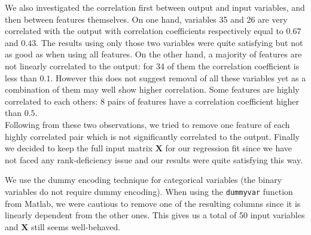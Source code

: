 \documentclass{article} %
\begin{document}
  We also investigated the correlation first between output and input variables, and then between features themselves. On one hand, variables 35 and 26 are very correlated with the output with correlation coefficients respectively equal to $0.67$ and $0.43$. The results using only those two variables were quite satisfying but not as good as when using all features. On the other hand, a majority of features are not linearly correlated to the output: for 34 of them the correlation coefficient is less than $0.1$. However this does not suggest removal of all these variables yet as a combination of them may well show higher correlation. Some features are highly correlated to each others: 8 pairs of features have a correlation coefficient higher than $0.5$.\\
  Following from these two observations, we tried to remove one feature of each highly correlated pair which is not significantly correlated to the output. Finally we decided to keep the full input matrix $\mathbf{X}$ for our regression fit since we have not faced any rank-deficiency issue and our results were quite satisfying this way.

  We use the dummy encoding technique for categorical variables (the binary variables do not require dummy encoding). When using the \texttt{dummyvar} function from Matlab, we were cautious to remove one of the resulting columns since it is linearly dependent from the other ones. This gives us a total of 50 input variables and $\mathbf{X}$ still seems well-behaved.
\end{document}
